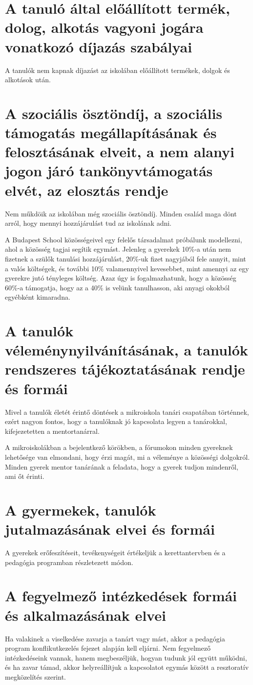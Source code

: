 \documentclass{article}
\begin{document}
\section{A tanuló által előállított termék, dolog, alkotás vagyoni jogára vonatkozó díjazás szabályai}
A tanulók nem kapnak díjazást az iskolában előállított termékek, dolgok és alkotások után.

\section{A szociális ösztöndíj, a szociális támogatás megállapításának és felosztásának elveit, a nem alanyi jogon járó tankönyvtámogatás elvét, az elosztás rendje}
Nem műkdöik az iskolában még szociális ösztöndíj. Minden család maga dönt arról, hogy mennyi hozzájárulást tud az iskolának adni.

A Budapest School közösségeivel egy felelős társadalmat próbálunk modellezni, ahol a közösség tagjai segítik egymást. Jelenleg a gyerekek 10\%-a után nem fizetnek a szülők tanulási hozzájárulást, 20\%-uk fizet nagyjából fele annyit, mint a valós költségek, és további 10\% valamennyivel kevesebbet, mint amennyi az egy gyerekre jutó tényleges költség. Azaz úgy is fogalmazhatunk, hogy a közösség 60\%-a támogatja, hogy az a 40\% is velünk tanulhasson, aki anyagi okokból egyébként kimaradna.

\section{A tanulók véleménynyilvánításának, a tanulók rendszeres tájékoztatásának rendje és formái}
Mivel a tanulók életét érintő döntések a mikroiskola tanári csapatában történnek, ezért nagyon fontos, hogy a tanulóknak jó kapcsolata legyen a tanárokkal, kifejezetetten a mentortanárral.

A mikroiskolákban a bejelentkező körökben, a fórumokon minden gyereknek lehetősége van elmondani, hogy érzi magát, mi a véleménye a közösségi dolgokról. Minden gyerek mentor tanárának a feladata, hogy a gyerek tudjon mindenről, ami őt érinti.


\section{A gyermekek, tanulók jutalmazásának elvei és formái}
A gyerekek erőfeszítéseit, tevékenységeit értékeljük a kerettantervben és a pedagógia programban részletezett módon.

\section{A fegyelmező intézkedések formái és alkalmazásának elvei}
Ha valakinek a viselkedése zavarja a tanárt vagy mást, akkor a pedagógia program konflikutkezelés fejezet alapján kell eljárni. Nem fegyelmező intézkedéseink vannak, hanem megbeszéljük, hogyan tudunk jól együtt működni, és ha zavar támad, akkor helyreállítjuk a kapcsolatot egymás között a resztoratív megközelítés szerint.
\end{document}
